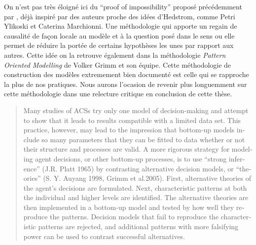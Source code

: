 On n'est pas très éloigné ici du \foreignquote{english}{proof of impossibility} proposé précédemment par \textcite{Cottineau2014b}, déjà inspiré par des auteurs proche des idées d'Hedstrom, comme Petri Ylikoski et Caterina Marchionni. Une méthodologie qui apporte un regain de causalité de façon locale au modèle et à la question posé dans le sens ou elle permet de réduire la portée de certains hypothèses les unes par rapport aux autres. Cette idée on la retrouve également dans la méthodologie \textit{Pattern Oriented Modelling} de Volker Grimm \autocites{Grimm2005, Railsback2012} et son équipe. Cette méthodologie de construction des modèles extremement bien documenté \autocite{Grimm2011} est celle qui se rapproche la plus de nos pratiques. Nous aurons l'ocasion de revenir plus longuemment sur cette méthodologie dans une relecture critique en conclusion de cette thèse.

\foreignblockquote{english}[\cite{Grimm2005}]{Many studies of ACSs try only one model of decision-making and attempt to show that it leads to results compatible with a limited data set. This practice, however, may lead to the impression that bottom-up models include so many parameters that they can be fitted to data whether or not their structure and processes are valid. A more rigorous strategy for modeling agent decisions, or other bottom-up processes, is to use \enquote{strong inference} (J.R. Platt 1965) by contrasting alternative decision models, or \enquote{theories} (S. Y. Auyang 1998, Grimm et al.2005). First, alternative theories of the agent’s decisions are formulated. Next, characteristic patterns at both the individual and higher levels are identified. The alternative theories are then implemented in a bottom-up model and tested by how well they reproduce the patterns. Decision models that fail to reproduce the characteristic patterns are rejected, and additional patterns with more falsifying power can be used to contrast successful alternatives.}


